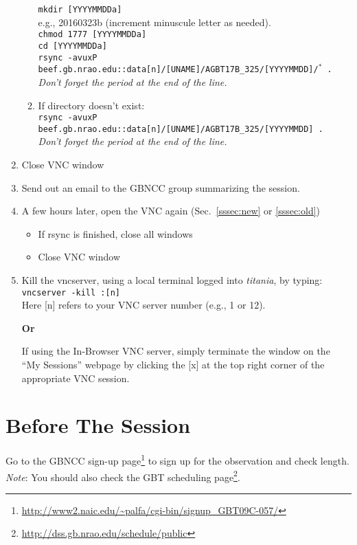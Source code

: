 \documentclass[11pt]{article}
\begin{document}
\begin{enumerate}
\begin{enumerate}
  \texttt{mkdir [YYYYMMDDa]} \\
  e.g., 20160323b (increment minuscule letter as needed). \\
  \texttt{chmod 1777 [YYYYMMDDa] \\
  cd [YYYYMMDDa] \\
  rsync -avuxP beef.gb.nrao.edu::data[n]/[UNAME]/AGBT17B\_325/[YYYYMMDD]/$^*$\,.} \\
  \textit{Don't forget the period at the end of the line.}
  \item If directory doesn't exist: \\
  \texttt{rsync -avuxP beef.gb.nrao.edu::data[n]/[UNAME]/AGBT17B\_325/[YYYYMMDD]\,.}  \\
  \textit{Don't forget the period at the end of the line.} \end{enumerate}
 \item Close VNC window
 \item Send out an email to the GBNCC group summarizing the session. 
 \item A few hours later, open the VNC again (Sec.~\ref{sssec:new} or \ref{sssec:old})\begin{itemize}
  \item If rsync is finished, close all windows
  \item Close VNC window \end{itemize}
 \item Kill the vncserver, using a local terminal logged into \textit{titania}, by typing: \\
 \indent\texttt{vncserver -kill :[n]} \\
 Here [n] refers to your VNC server number (e.g., 1 or 12).
 \begin{center} {\bfseries{Or}} \end{center} 
If using the In-Browser VNC server, simply terminate the window on the ``My Sessions'' webpage by clicking the [x] at the top right corner of the appropriate VNC session.

\end{enumerate}









\section{Before The Session}\label{sec:b4}  %
Go to the GBNCC sign-up page\footnote{\url{http://www2.naic.edu/~palfa/cgi-bin/signup_GBT09C-057/}}
to sign up for the observation and check length.  
\textit{Note}: You should also check the GBT scheduling page\footnote{\url{http://dss.gb.nrao.edu/schedule/public}}. 
\end{document}
